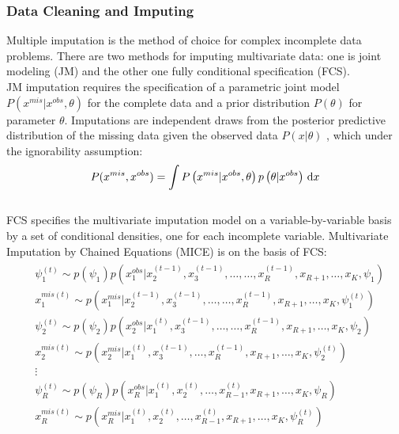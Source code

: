 	\subsubsection{Data Cleaning and Imputing}
	\noindent Multiple imputation\citep{DB1987multiple} is the method of choice for complex incomplete data problems. There are two methods for imputing multivariate data: one is joint modeling (JM) and the other one fully conditional specification (FCS)\citep{stef2007multiple}. \\
	[\baselineskip]\indent JM imputation\citep{JL1997analysis} requires the specification of a parametric joint model 
	$P\left({x}^{mis}|{x}^{obs},\theta\right)$ for the complete data and a prior distribution $P(\theta)$  for parameter  $\theta$. Imputations are independent draws from the posterior predictive distribution of the missing data given the observed data $P \left(x|\theta\right)$ , which under the ignorability assumption: \\
	\begin{equation}\label{}
		P({x}^{mis},{x}^{obs})=
		\int P\left({x}^{mis}|{x}^{obs},\theta\right)p\left(\theta| {x}^{obs}\right)\, \mathrm{d}x\\
	\end{equation}
	\\
	[\baselineskip]\indent FCS \citep{stef2015mice} specifies the multivariate imputation model on a variable-by-variable basis by a set of conditional densities, one for each incomplete variable. Multivariate Imputation by Chained Equations (MICE) is on the basis of FCS:\\
	\begin{eqnarray}\label{}
		\begin{split}
			&\psi_1^{(t)}\sim p(\psi_1)p\left( x_1^{obs}|x_2^{(t-1)},x_3^{(t-1)},\dots,\dots,x_{R}^{(t-1)}, x_{R+1},\dots, x_K, \psi_1\right)\\
			&x_1^{mis(t)}\sim p\left(x_1^{mis}|x_2^{(t-1)},x_3^{(t-1)},\dots,\dots,x_{R}^{(t-1)}, x_{R+1},\dots, x_K, \psi_1^{(t)}\right)\\
			&\psi_2^{(t)}\sim p(\psi_2)p\left( x_2^{obs}|x_1^{(t)},x_3^{(t-1)},\dots,\dots,x_{R}^{(t-1)}, x_{R+1},\dots, x_K, \psi_2\right)\\
			&x_2^{mis(t)}\sim p\left(x_2^{mis}|x_1^{(t)},x_3^{(t-1)},\dots,x_R^{(t-1)},x_{R+1},\dots, x_K, \psi_2^{(t)}\right)\\
			& \vdots\\
			&\psi_R^{(t)}\sim p(\psi_R)p\left( x_R^{obs}|x_1^{(t)},x_2^{(t)},\dots,x_{R-1}^{(t)}, x_{R+1},\dots, x_K, \psi_R\right)\\
			&x_R^{mis(t)}\sim p\left(x_ R^{mis}|x_1^{(t)},x_2^{(t)},\dots,x_{R-1}^{(t)}, x_{R+1},\dots, x_K, \psi_ R^{(t)}\right)
		\end{split}
	\end{eqnarray}
	\\

